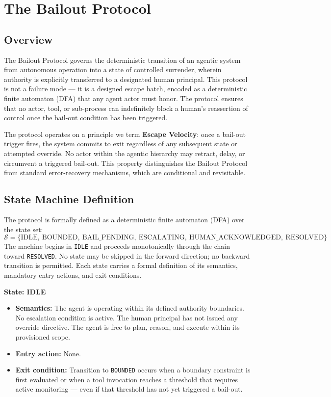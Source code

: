 \section{The Bailout Protocol}

\subsection{Overview}

The Bailout Protocol governs the deterministic transition of an agentic system from autonomous operation into a state of controlled surrender, wherein authority is explicitly transferred to a designated human principal. This protocol is not a failure mode — it is a designed escape hatch, encoded as a deterministic finite automaton (DFA) that any agent actor must honor. The protocol ensures that no actor, tool, or sub-process can indefinitely block a human's reassertion of control once the bail-out condition has been triggered.

The protocol operates on a principle we term \textbf{Escape Velocity}: once a bail-out trigger fires, the system commits to exit regardless of any subsequent state or attempted override. No actor within the agentic hierarchy may retract, delay, or circumvent a triggered bail-out. This property distinguishes the Bailout Protocol from standard error-recovery mechanisms, which are conditional and revisitable.

\bigskip

\subsection{State Machine Definition}

The protocol is formally defined as a deterministic finite automaton (DFA) over the state set:
%
\[
\mathcal{S} = \{\text{IDLE},\ \text{BOUNDED},\ \text{BAIL\_PENDING},\ \text{ESCALATING},\ \text{HUMAN\_ACKNOWLEDGED},\ \text{RESOLVED}\}
\]
%
The machine begins in \texttt{IDLE} and proceeds monotonically through the chain toward \texttt{RESOLVED}. No state may be skipped in the forward direction; no backward transition is permitted. Each state carries a formal definition of its semantics, mandatory entry actions, and exit conditions.

\bigskip

\noindent\textbf{State: IDLE}

\begin{itemize}
  \item \textbf{Semantics:} The agent is operating within its defined authority boundaries. No escalation condition is active. The human principal has not issued any override directive. The agent is free to plan, reason, and execute within its provisioned scope.
  \item \textbf{Entry action:} None.
  \item \textbf{Exit condition:} Transition to \texttt{BOUNDED} occurs when a boundary constraint is first evaluated or when a tool invocation reaches a threshold that requires active monitoring — even if that threshold has not yet triggered a bail-out.
\end{itemize}

